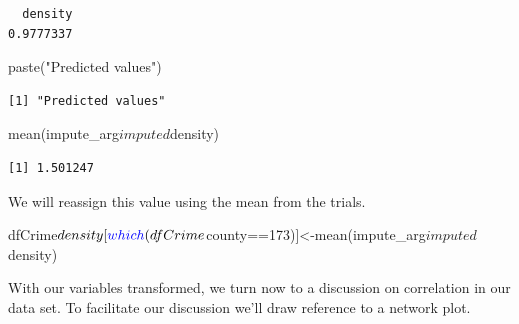 \documentclass[]{article}
\newenvironment{Shaded}{}{}
\newcommand{\DecValTok}[1]{#1}
\newcommand{\KeywordTok}[1]{\textcolor[rgb]{0.00,0.00,1.00}{#1}}
\newcommand{\NormalTok}[1]{#1}
\newcommand{\OperatorTok}[1]{#1}
\newcommand{\StringTok}[1]{\textcolor[rgb]{0.00,0.50,0.50}{#1}}
\begin{document}
\begin{verbatim}
  density 
0.9777337 
\end{verbatim}

\begin{Shaded}
\begin{Highlighting}[]
\KeywordTok{paste}\NormalTok{(}\StringTok{"Predicted values"}\NormalTok{)}
\end{Highlighting}
\end{Shaded}

\begin{verbatim}
[1] "Predicted values"
\end{verbatim}

\begin{Shaded}
\begin{Highlighting}[]
\KeywordTok{mean}\NormalTok{(impute_arg}\OperatorTok{$}\NormalTok{imputed}\OperatorTok{$}\NormalTok{density)}
\end{Highlighting}
\end{Shaded}

\begin{verbatim}
[1] 1.501247
\end{verbatim}

We will reassign this value using the mean from the trials.

\begin{Shaded}
\begin{Highlighting}[]
\NormalTok{dfCrime}\OperatorTok{$}\NormalTok{density[}\KeywordTok{which}\NormalTok{(dfCrime}\OperatorTok{$}\NormalTok{county}\OperatorTok{==}\DecValTok{173}\NormalTok{)]<-}\KeywordTok{mean}\NormalTok{(impute_arg}\OperatorTok{$}\NormalTok{imputed}\OperatorTok{$}\NormalTok{density)}
\end{Highlighting}
\end{Shaded}

With our variables transformed, we turn now to a discussion on
correlation in our data set. To facilitate our discussion we'll draw
reference to a network plot.
\end{document}
